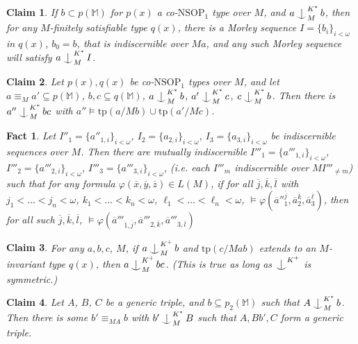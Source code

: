 \documentclass[10pt,a4paper]{amsart}
\newtheorem{claim}{Claim}
\newtheorem{fact}{Fact}
\def\Ind#1#2{#1\setbox0=\hbox{$#1x$}\kern\wd0\hbox to 0pt{\hss$#1\mid$\hss}
\lower.9\ht0\hbox to 0pt{\hss$#1\smile$\hss}\kern\wd0}
\def\ind{\mathop{\mathpalette\Ind{}}}
\begin{document}
\begin{claim}\label{4-cc4}
If  $b \subset p(\mathbb{M})$ for $p(x)$ a co-$\mathrm{NSOP}_{1}$ type over $M$, and $a \ind^{K^{*}}_{M} b $, then for any $M$-finitely satisfiable type $q(x)$, there is a Morley sequence $I=\{b_{i}\}_{i < \omega}$ in $q(x)$, $b_{0} =b$, that is indiscernible over $Ma$, and any such Morley sequence will satisfy $a \ind^{K^{*}}_{M} I$. 
\end{claim}

\begin{claim}\label{4-ind4}
 Let $p(x), q(x)$ be co-$\mathrm{NSOP}_{1}$ types over $M$, and let $a \equiv_{M} a' \subseteq p(\mathbb{M})$, $b, c \subseteq q(\mathbb{M})$, $a \ind^{K^{*}}_{M} b$, $a' \ind^{K^{*}}_{M} c$, $c \ind^{K^{*}}_{M} b$. Then there is $a'' \ind_{M}^{K^{*}} bc$  with $a'' \models \mathrm{tp}(a/Mb) \cup \mathrm{tp}(a'/Mc)$. 
\end{claim}

\begin{fact}\label{4-indisc4}
Let $I''_{1}=\{a''_{1, i}\}_{i < \omega}$, $I_{2}=\{a_{2, i}\}_{i < \omega}$, $I_{3}=\{a_{3, i}\}_{i < \omega}$ be indiscernible sequences over $M$. Then there are mutually indiscernible $I'''_{1}=\{a'''_{1, i}\}_{i < \omega}$, $I'''_{2}=\{a'''_{2, i}\}_{i < \omega}$, $I'''_{3}=\{a'''_{3, i}\}_{i < \omega}$, (i.e. each $I'''_{m}$ indiscernible over $MI'''_{\neq m}$) such that for any formula $\varphi(\overline{x}, \overline{y}, \overline{z}) \in L(M)$, if for all $\overline{j}, \overline{k}, \overline{l}$ with $j_{1}< \ldots<  j_{n} < \omega$, $k_{1}< \ldots<  k_{n} < \omega$, $\ell_{1}< \ldots<  \ell_{n} < \omega$, $\models \varphi(\overline{a}''^{\overline{j}}_{1}, \overline{a}^{\overline{k}}_{2}, \overline{a}^{\overline{\ell}}_{3})  $, then for all such $\overline{j}, \overline{k}, \overline{l}$, $\models \varphi(\overline{a}'''_{1, \overline{j}}, \overline{a}'''_{2, \overline{k}}, \overline{a}'''_{3, \overline{l}})  $ 
\end{fact}

\begin{claim}\label{4-inv5}
For any $a, b, c$, $M$, if $a \ind^{K^{+}}_{M} b$ and $\mathrm{tp}(c/Mab)$ extends to an $M$-invariant type $q(x)$, then $a \ind^{K^{+}}_{M} bc$. (This is true as long as $\ind^{K^{+}}$ is symmetric.)
\end{claim}

\begin{claim}\label{4-theclaim4}
    Let $A$, $B$, $C$ be a generic triple, and $b \subseteq p_{2}(\mathbb{M})$ such that $A \ind^{K^{*}}_{M} b$. Then there is some $b' \equiv_{MA} b$ with $b' \ind^{K^{*}}_{M} B$ such that $A, Bb', C$ form a generic triple.
\end{claim}
\end{document}
